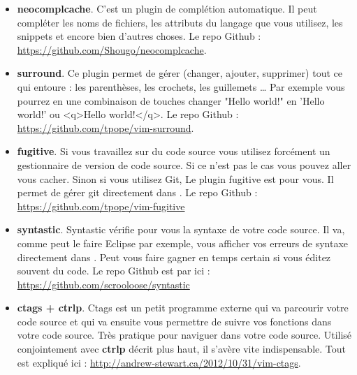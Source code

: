 \begin{itemize}

    \item \textbf{neocomplcache}. C'est un plugin de complétion automatique. Il peut compléter les noms de fichiers, les attributs du langage que vous utilisez, les snippets et encore bien d'autres choses. Le repo Github : \url{https://github.com/Shougo/neocomplcache}.

    \item \textbf{surround}. Ce plugin permet de gérer (changer, ajouter, supprimer) tout ce qui \og entoure \fg{} : les parenthèses, les crochets, les guillemets … Par exemple vous pourrez en une combinaison de touches changer "Hello world!" en 'Hello world!' ou <q>Hello world!</q>. Le repo Github : \url{https://github.com/tpope/vim-surround}.

    \item \textbf{fugitive}. Si vous travaillez sur du code source vous utilisez forcément un gestionnaire de version de code source. Si ce n'est pas le cas vous pouvez aller vous cacher. Sinon si vous utilisez Git, Le plugin fugitive est pour vous. Il permet de gérer git directement dans \vim. Le repo Github :  \url{https://github.com/tpope/vim-fugitive}

    \item \textbf{syntastic}. Syntastic vérifie pour vous la syntaxe de votre code source. Il va, comme peut le faire Eclipse par exemple, vous afficher vos erreurs de syntaxe directement dans \vim. Peut vous faire gagner en temps certain si vous éditez souvent du code. Le repo Github est par ici : \url{https://github.com/scrooloose/syntastic}

    \item \textbf{ctags + ctrlp}. Ctags est un petit programme externe qui va parcourir votre code source et qui va ensuite vous permettre de \og suivre \fg vos fonctions dans votre code source. Très pratique pour naviguer dans votre code source. Utilisé conjointement avec \textbf{ctrlp} décrit plus haut, il s'avère vite indispensable. Tout est expliqué ici : \url{http://andrew-stewart.ca/2012/10/31/vim-ctags}.

\end{itemize}
